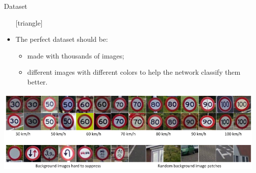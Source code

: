 \documentclass{beamer}
\begin{document}
\begin{frame}{Dataset}
	\begin{itemize}
		\setlength\itemsep{1em}
		[triangle]
		\item 
			The perfect dataset should be:
			\begin{itemize}
				[circle]
				\item 
					made with thousands of images;
				\item 
					different images with different colors to help the network classify them better.
			\end{itemize}
	\end{itemize}
	\begin{center}
		\includegraphics[scale=0.35]{datasets}
	\end{center}
\end{frame}

\end{document}
